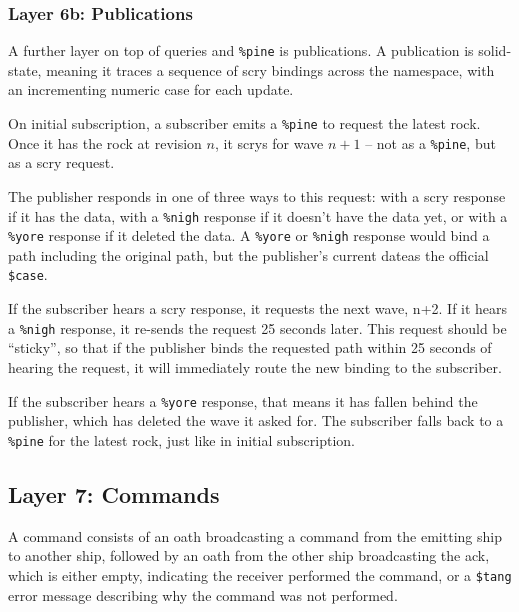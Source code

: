\documentclass[twoside]{article}
\begin{document}
\subsubsection{Layer 6b: Publications}

A further layer on top of queries and \lstinline[style=inlinecode]{%pine} is publications. A publication is solid-state, meaning it traces a sequence of scry bindings across the namespace, with an incrementing numeric case for each update.

On initial subscription, a subscriber emits a \lstinline[style=inlinecode]{%pine} to request the latest rock. Once it has the rock at revision $n$, it scrys for wave $n+1$ – not as a \lstinline[style=inlinecode]{%pine}, but as a scry request.

The publisher responds in one of three ways to this request: with a scry response if it has the data, with a \lstinline[style=inlinecode]{%nigh} response if it doesn't have the data yet, or with a \lstinline[style=inlinecode]{%yore} response if it deleted the data. A \lstinline[style=inlinecode]{%yore} or \lstinline[style=inlinecode]{%nigh} response would bind a path including the original path, but the publisher's current dateas the official \lstinline[style=inlinecode]{$case}.

If the subscriber hears a scry response, it requests the next wave, n+2. If it hears a \lstinline[style=inlinecode]{%nigh} response, it re-sends the request 25 seconds later. This request should be ``sticky'', so that if the publisher binds the requested path within 25 seconds of hearing the request, it will immediately route the new binding to the subscriber.

If the subscriber hears a \lstinline[style=inlinecode]{%yore} response, that means it has fallen behind the publisher, which has deleted the wave it asked for. The subscriber falls back to a \lstinline[style=inlinecode]{%pine} for the latest rock, just like in initial subscription.

\subsection{Layer 7: Commands}

A command consists of an oath broadcasting a command from the emitting ship to another ship, followed by an oath from the other ship broadcasting the ack, which is either empty, indicating the receiver performed the command, or a \lstinline[style=inlinecode]{$tang} error message describing why the command was not performed.
\end{document}

